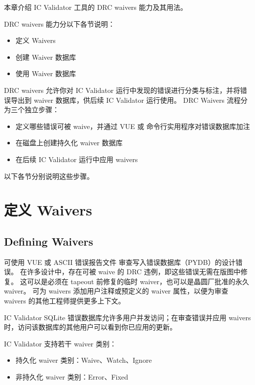 \label{chap:waiver}

本章介绍 IC Validator 工具的 DRC waivers 能力及其用法。

DRC waivers 能力分以下各节说明：
\begin{itemize}
  \item 定义 Waivers
  \item 创建 Waiver 数据库
  \item 使用 Waiver 数据库
\end{itemize}

DRC waivers 允许你对 IC Validator 运行中发现的错误进行分类与标注，并将错误导出到 waiver 数据库，供后续 IC Validator 运行使用。
DRC Waivers 流程分为三个独立步骤：
\begin{itemize}
  \item 定义哪些错误可被 waive，并通过 VUE 或  命令行实用程序对错误数据库加注
  \item 在磁盘上创建持久化 waiver 数据库
  \item 在后续 IC Validator 运行中应用 waivers
\end{itemize}

以下各节分别说明这些步骤。


\section{定义 Waivers}
\subsection*{Defining Waivers}

可使用 VUE 或 ASCII 错误报告文件  审查写入错误数据库（PYDB）的设计错误。
在许多设计中，存在可被 waive 的 DRC 违例，即这些错误无需在版图中修复。
这可以是必须在 tapeout 前修复的临时 waiver，也可以是晶圆厂批准的永久 waiver。
可为 waivers 添加用户注释或预定义的 waiver 属性，以便为审查 waivers 的其他工程师提供更多上下文。

IC Validator SQLite 错误数据库允许多用户并发访问；在审查错误并应用 waivers 时，访问该数据库的其他用户可以看到你已应用的更新。

IC Validator 支持若干 waiver 类别：
\begin{itemize}
  \item 持久化 waiver 类别：Waive、Watch、Ignore
  \item 非持久化 waiver 类别：Error、Fixed
\end{itemize}

